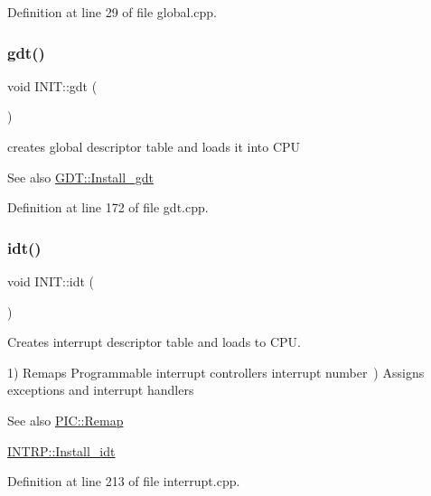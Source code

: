 Definition at line 29 of file global.\+cpp.

\mbox{\label{namespace_i_n_i_t_a3462d7bc51bce77cc240d05b62b1b777}} 
\subsubsection{\texorpdfstring{gdt()}{gdt()}}
{\footnotesize\ttfamily void I\+N\+I\+T\+::gdt (\begin{DoxyParamCaption}{ }\end{DoxyParamCaption})}



creates global descriptor table and loads it into C\+PU 

\begin{DoxySeeAlso}{See also}
\hyperlink{namespace_g_d_t_a174feb7c5a037cc991bf4eb27c256366}{G\+D\+T\+::\+Install\+\_\+gdt} 
\end{DoxySeeAlso}


Definition at line 172 of file gdt.\+cpp.

\mbox{\label{namespace_i_n_i_t_aec8e9f01cb09653075b6e610096b3ca9}} 
\subsubsection{\texorpdfstring{idt()}{idt()}}
{\footnotesize\ttfamily void I\+N\+I\+T\+::idt (\begin{DoxyParamCaption}{ }\end{DoxyParamCaption})}



Creates interrupt descriptor table and loads to C\+PU. 

1) Remaps Programmable interrupt controller\textquotesingle{}s interrupt number~) Assigns exceptions and interrupt handlers \begin{DoxySeeAlso}{See also}
\hyperlink{namespace_p_i_c_a2a04fe95329faacc43f00ad30fe554b9}{P\+I\+C\+::\+Remap} 

\hyperlink{namespace_i_n_t_r_p_a139b273cc1e45d3c2fdfe0d387a98518}{I\+N\+T\+R\+P\+::\+Install\+\_\+idt} 
\end{DoxySeeAlso}


Definition at line 213 of file interrupt.\+cpp.

